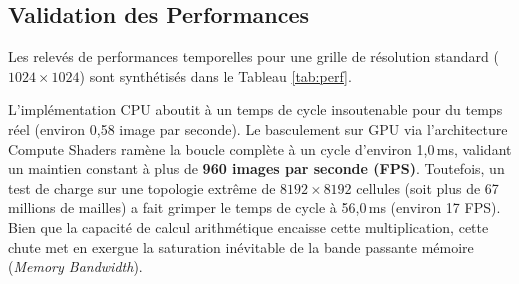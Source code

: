 \documentclass[10pt,twocolumn,a4paper]{article}
\begin{document}
\subsection{Validation des Performances}\label{subsec:performances}
Les relevés de performances temporelles pour une grille de résolution standard ($1024 \times 1024$) sont synthétisés dans le Tableau \ref{tab:perf}.

\begin{table}[htbp]
    \centering
    \caption{Tableau comparatif des performances (Résolution : $1024 \times 1024$). L'implémentation GPU aboutit à un temps de cycle global de l'ordre de la milliseconde, permettant de dépasser le seuil critique des +960 images par seconde (FPS).}
    \label{tab:perf}
\end{table}

L'implémentation CPU aboutit à un temps de cycle insoutenable pour du temps réel (environ 0,58 image par seconde). Le basculement sur GPU via l'architecture Compute Shaders ramène la boucle complète à un cycle d'environ 1,0\,ms, validant un maintien constant à plus de \textbf{960 images par seconde (FPS)}.
Toutefois, un test de charge sur une topologie extrême de $8192 \times 8192$ cellules (soit plus de 67 millions de mailles) a fait grimper le temps de cycle à 56,0\,ms (environ 17 FPS). Bien que la capacité de calcul arithmétique encaisse cette multiplication, cette chute met en exergue la saturation inévitable de la bande passante mémoire (\textit{Memory Bandwidth}).
\end{document}
